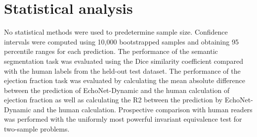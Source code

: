 \section{Statistical analysis}

No statistical methods were used to predetermine sample size. Confidence intervals were computed using 10,000 bootstrapped samples and obtaining 95 percentile ranges for each prediction. The performance of the semantic segmentation task was evaluated using the Dice similarity coefficient compared with the human labels from the held-out test dataset. The performance of the ejection fraction task was evaluated by calculating the mean absolute difference between the prediction of EchoNet-Dynamic and the human calculation of ejection fraction as well as calculating the R2 between the prediction by EchoNet-Dynamic and the human calculation. Prospective comparison with human readers was performed with the uniformly most powerful invariant equivalence test for two-sample problems.
